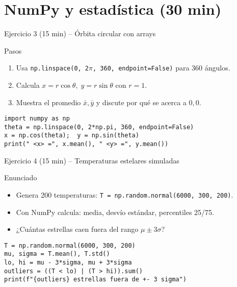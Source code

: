 \documentclass[10pt]{beamer}
\begin{document}
\section{NumPy y estadística (30 min)}

\begin{frame}[fragile]{Ejercicio 3 (15 min) -- Órbita circular con arrays}
\begin{block}{Pasos}
  \begin{enumerate}
    \item Usa \texttt{np.linspace(0,\,2\(\pi\),\,360, endpoint=False)} para 360 ángulos.
    \item Calcula \(\displaystyle x=r\cos\theta,\;y=r\sin\theta\) con \(r=1\).
    \item Muestra el promedio \(\bar x,\bar y\) y discute por qué se acerca a \(0,0\).
  \end{enumerate}
\end{block}
\begin{verbatim}
import numpy as np
theta = np.linspace(0, 2*np.pi, 360, endpoint=False)
x = np.cos(theta);  y = np.sin(theta)
print(" <x> =", x.mean(), " <y> =", y.mean())
\end{verbatim}
\end{frame}

\begin{frame}[fragile]{Ejercicio 4 (15 min) – Temperaturas estelares simuladas}
\begin{block}{Enunciado}
  \begin{itemize}
    \item Genera 200 temperaturas: \texttt{T = np.random.normal(6000, 300, 200)}.
    \item Con NumPy calcula: media, desvío estándar, percentiles 25/75.
    \item ¿Cuántas estrellas caen fuera del rango \(\mu \pm 3\sigma\)?
  \end{itemize}
\end{block}
\begin{verbatim}
T = np.random.normal(6000, 300, 200)
mu, sigma = T.mean(), T.std()
lo, hi = mu - 3*sigma, mu + 3*sigma
outliers = ((T < lo) | (T > hi)).sum()
print(f"{outliers} estrellas fuera de +- 3 sigma")
\end{verbatim}
\end{frame}

\end{document}

